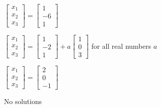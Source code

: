 \documentclass{article}
\begin{document}
\begin{readinessAssuranceTest}
  \begin{multicols}{2}
  \begin{readinessAssuranceTestChoices}
  \item \(
          \begin{bmatrix}
            x_1 \\ x_2 \\ x_3
          \end{bmatrix}=
          \begin{bmatrix}
            1 \\ -6 \\ 1
          \end{bmatrix}
        \)
  \item \(
          \begin{bmatrix}
            x_1 \\ x_2 \\ x_3
          \end{bmatrix}=
          \begin{bmatrix}
            1 \\ -2 \\ 1
          \end{bmatrix}+
          a
          \begin{bmatrix}
            1 \\ 0 \\ 3
          \end{bmatrix}
        \)  for all real numbers \(a\)
\item \(
          \begin{bmatrix}
            x_1 \\ x_2 \\ x_3
          \end{bmatrix}=
          \begin{bmatrix}
            2 \\ 0 \\ -1
          \end{bmatrix}
        \) %

  \item No solutions
  \end{readinessAssuranceTestChoices}
  \end{multicols}




\end{readinessAssuranceTest}
\end{document}
